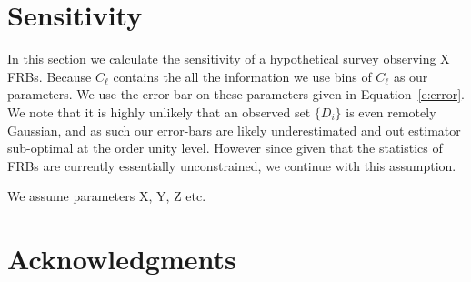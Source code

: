 \documentclass[twocolumn,prd,noshowpacs,nofootinbib,amsmath,amssymb]{revtex4}
\begin{document}
\section{Sensitivity}

In this section we calculate the sensitivity of a hypothetical survey observing
X FRBs. Because $C_\ell$ contains the all the information we use bins
of $C_\ell$ as our parameters. We use the error bar on these parameters given
in Equation~\ref{e:error}.  We note that it is highly unlikely that an observed
set $\{D_i\}$ is even remotely Gaussian, and as such our error-bars are likely
underestimated and out estimator sub-optimal at the order unity level. 
However since given that the statistics of FRBs are currently essentially
unconstrained, we continue with this assumption.

We assume parameters X, Y, Z etc.



\bigskip
\section*{Acknowledgments}
\medskip

 


\end{document}
